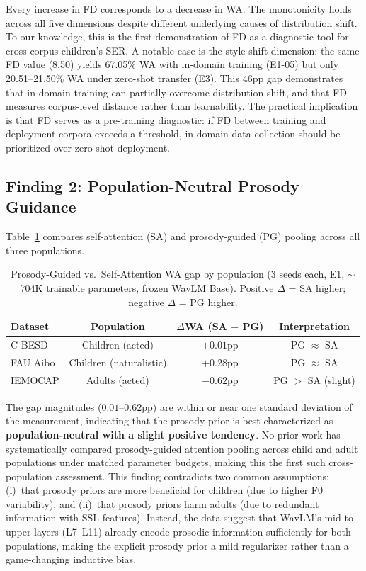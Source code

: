 \documentclass[11pt,a4paper]{article}
\begin{document}
Every increase in FD corresponds to a decrease in WA. The monotonicity holds
across all five dimensions despite different underlying causes of distribution
shift. To our knowledge, this is the first demonstration of FD as a diagnostic
tool for cross-corpus children's SER. A notable case is the style-shift dimension: the same FD value (8.50)
yields 67.05\% WA with in-domain training (E1-05) but only 20.51--21.50\% WA
under zero-shot transfer (E3). This 46pp gap demonstrates that in-domain
training can partially overcome distribution shift, and that FD measures
corpus-level distance rather than learnability. The practical implication is
that FD serves as a pre-training diagnostic: if FD between training and
deployment corpora exceeds a threshold, in-domain data collection should be
prioritized over zero-shot deployment.

\subsection{Finding 2: Population-Neutral Prosody Guidance}

Table~\ref{tab:prosody_gap} compares self-attention (SA) and prosody-guided
(PG) pooling across all three populations.

\begin{table}[h]
\centering
\caption{Prosody-Guided vs.\ Self-Attention WA gap by population (3 seeds each, E1, $\sim$704K trainable parameters, frozen WavLM Base). Positive $\Delta$ = SA higher; negative $\Delta$ = PG higher.}
\label{tab:prosody_gap}
\begin{tabular}{lccc}
\toprule
\textbf{Dataset} & \textbf{Population} & \textbf{$\Delta$WA (SA $-$ PG)} & \textbf{Interpretation} \\
\midrule
C-BESD   & Children (acted)      & $+0.01$pp & PG $\approx$ SA \\
FAU Aibo & Children (naturalistic) & $+0.28$pp & PG $\approx$ SA \\
IEMOCAP  & Adults (acted)        & $-0.62$pp & PG $>$ SA (slight) \\
\bottomrule
\end{tabular}
\end{table}

The gap magnitudes ($0.01$--$0.62$pp) are within or near one standard deviation
of the measurement, indicating that the prosody prior is best characterized as
\textbf{population-neutral with a slight positive tendency}. No prior work has
systematically compared prosody-guided attention pooling across child and adult
populations under matched parameter budgets, making this the first such
cross-population assessment. This finding
contradicts two common assumptions: (i)~that prosody priors are more beneficial
for children (due to higher F0 variability), and (ii)~that prosody priors harm
adults (due to redundant information with SSL features). Instead, the data
suggest that WavLM's mid-to-upper layers (L7--L11) already encode prosodic
information sufficiently for both populations, making the explicit prosody
prior a mild
regularizer rather than a game-changing inductive bias.
\end{document}
